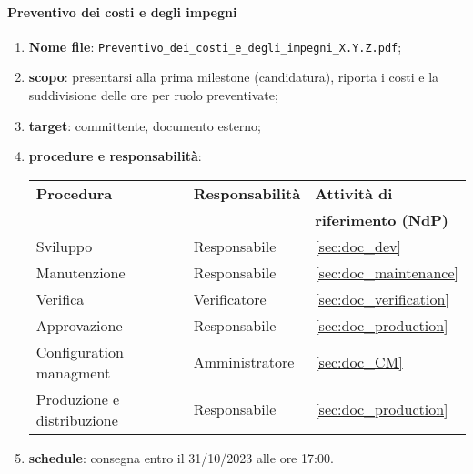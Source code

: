         \paragraph{Preventivo dei costi e degli impegni}
            \begin{enumerate}
                \item \textbf{Nome file}: \texttt{Preventivo\_dei\_costi\_e\_degli\_impegni\_X.Y.Z.pdf};
                \item \textbf{scopo}: presentarsi alla prima milestone (candidatura), riporta i costi e la suddivisione delle ore per ruolo preventivate;
                \item \textbf{target}: committente, documento esterno;
                \item \textbf{procedure e responsabilità}:
                \\
                \begin{tabularx}{0.93\textwidth}{|X|X|X|}
                    \hline
                    \textbf{Procedura} & \textbf{Responsabilità} & \textbf{Attività di} \\
                    & & \textbf{riferimento (NdP)} \\
                    \hline
                    Sviluppo & Responsabile &  \ref{sec:doc_dev}
                    \\\hline
                    Manutenzione & Responsabile & \ref{sec:doc_maintenance}
                    \\\hline
                    Verifica & Verificatore & \ref{sec:doc_verification}
                    \\\hline
                    Approvazione & Responsabile & \ref{sec:doc_production}
                    \\\hline
                    Configuration managment & Amministratore & \ref{sec:doc_CM}
                    \\\hline
                    Produzione e distribuzione & Responsabile & \ref{sec:doc_production}
                    \\\hline
                \end{tabularx}
                \item \textbf{schedule}: consegna entro il 31/10/2023 alle ore 17:00.
            \end{enumerate} 

